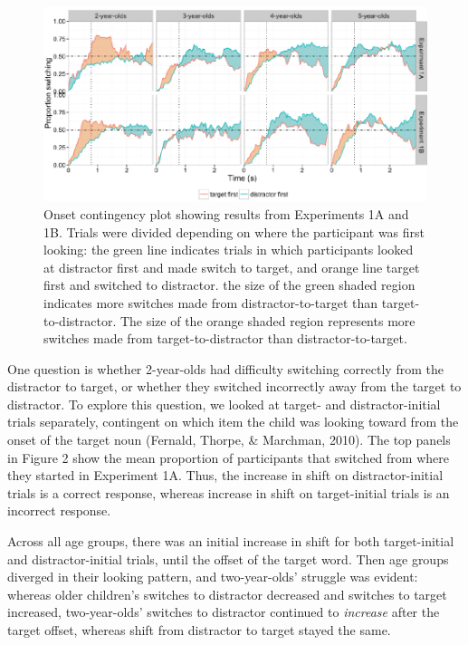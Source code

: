 \documentclass[a4paper,man,apacite,floatsintext]{apa6}
\newenvironment{CodeChunk}{}{}
\begin{document}
\begin{CodeChunk}
\begin{figure}[H]

{\centering \includegraphics{figs/et_onset1-1} 

}

\caption[Onset contingency plot showing results from Experiments 1A and 1B]{Onset contingency plot showing results from Experiments 1A and 1B. Trials were divided depending on where the participant was first looking: the green line indicates trials in which participants looked at distractor first and made switch to target, and orange line target first and switched to distractor. the size of the green shaded region indicates more switches made from distractor-to-target than target-to-distractor. The size of the orange shaded region represents more switches made from target-to-distractor than distractor-to-target.}\label{fig:et_onset1}
\end{figure}
\end{CodeChunk}

One question is whether 2-year-olds had difficulty switching correctly
from the distractor to target, or whether they switched incorrectly away
from the target to distractor. To explore this question, we looked at
target- and distractor-initial trials separately, contingent on which
item the child was looking toward from the onset of the target noun
(Fernald, Thorpe, \& Marchman, 2010). The top panels in Figure 2 show
the mean proportion of participants that switched from where they
started in Experiment 1A. Thus, the increase in shift on
distractor-initial trials is a correct response, whereas increase in
shift on target-initial trials is an incorrect response.

Across all age groups, there was an initial increase in shift for both
target-initial and distractor-initial trials, until the offset of the
target word. Then age groups diverged in their looking pattern, and
two-year-olds' struggle was evident: whereas older children's switches
to distractor decreased and switches to target increased, two-year-olds'
switches to distractor continued to \emph{increase} after the target
offset, whereas shift from distractor to target stayed the same.
\end{document}
